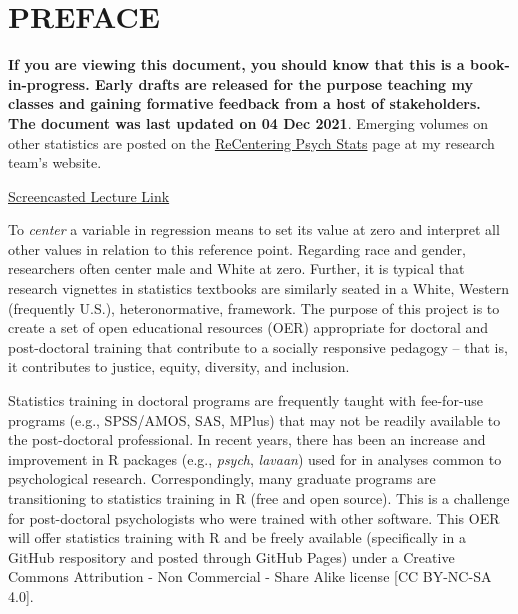 \documentclass[
]{book}
\begin{document}
\hypertarget{preface}{%
\chapter*{PREFACE}\label{preface}}

\textbf{If you are viewing this document, you should know that this is a book-in-progress. Early drafts are released for the purpose teaching my classes and gaining formative feedback from a host of stakeholders. The document was last updated on 04 Dec 2021}. Emerging volumes on other statistics are posted on the \href{https://lhbikos.github.io/BikosRVT/ReCenter.html}{ReCentering Psych Stats} page at my research team's website.

\href{https://spu.hosted.panopto.com/Panopto/Pages/Viewer.aspx?id=c932455e-ef06-444a-bdca-acf7012d759a}{Screencasted Lecture Link}

To \emph{center} a variable in regression means to set its value at zero and interpret all other values in relation to this reference point. Regarding race and gender, researchers often center male and White at zero. Further, it is typical that research vignettes in statistics textbooks are similarly seated in a White, Western (frequently U.S.), heteronormative, framework. The purpose of this project is to create a set of open educational resources (OER) appropriate for doctoral and post-doctoral training that contribute to a socially responsive pedagogy -- that is, it contributes to justice, equity, diversity, and inclusion.

Statistics training in doctoral programs are frequently taught with fee-for-use programs (e.g., SPSS/AMOS, SAS, MPlus) that may not be readily available to the post-doctoral professional. In recent years, there has been an increase and improvement in R packages (e.g., \emph{psych}, \emph{lavaan}) used for in analyses common to psychological research. Correspondingly, many graduate programs are transitioning to statistics training in R (free and open source). This is a challenge for post-doctoral psychologists who were trained with other software. This OER will offer statistics training with R and be freely available (specifically in a GitHub respository and posted through GitHub Pages) under a Creative Commons Attribution - Non Commercial - Share Alike license {[}CC BY-NC-SA 4.0{]}.
\end{document}
